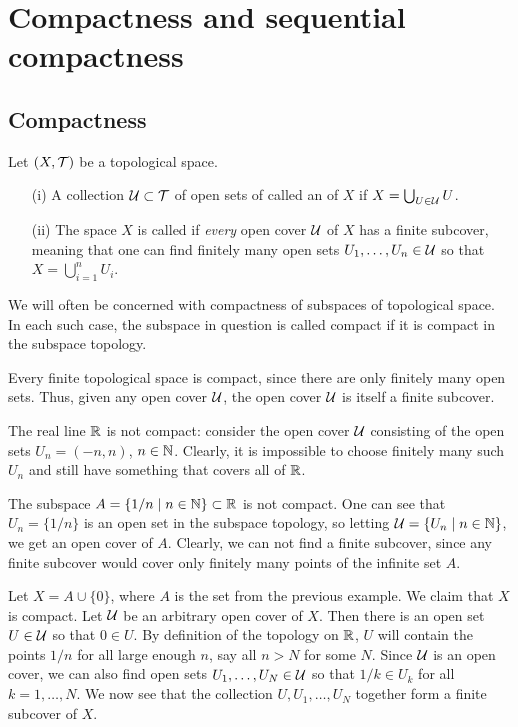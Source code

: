 \section{Compactness and sequential compactness}
\label{compactness}
\subsection{Compactness}
\begin{defn}
  Let $(X,\mathcal{T})$ be a topological space.
  \begin{enumerate}
    \item[(i)] A collection $\mathcal{U} \subset \mathcal{T}$ of open sets of called an  of $X$ if $X = \bigcup_{U \in \mathcal{U}} U$.
    \item[(ii)] The space $X$ is called  if \emph{every} open cover $\mathcal{U}$ of $X$ has a finite subcover, meaning that one can find finitely many open sets $U_1, \dots, U_n \in \mathcal{U}$ so that $X = \bigcup_{i=1}^n U_i$.
  \end{enumerate}
\end{defn}
We will often be concerned with compactness of subspaces of topological space. In each such case, the subspace in question is called compact if it is compact in the subspace topology.
\begin{example}
  Every finite topological space is compact, since there are only finitely many open sets. Thus, given any open cover $\mathcal{U}$, the open cover $\mathcal{U}$ is itself a finite subcover.
\end{example}
\begin{example}
  \label{reals-not-compact}
  The real line $\mathbb{R}$ is not compact: consider the open cover $\mathcal{U}$ consisting of the open sets $U_n = (-n,n)$, $n \in \mathbb{N}$. Clearly, it is impossible to choose finitely many such $U_n$ and still have something that covers all of $\mathbb{R}$.
\end{example}
\begin{example}
  The subspace $A = \{1/n \mid n \in \mathbb{N}\} \subset \mathbb{R}$ is not compact. One can see that $U_n = \{1/n\}$ is an open set in the subspace topology, so letting $\mathcal{U} = \{U_n \mid n \in \mathbb{N}\}$, we get an open cover of $A$. Clearly, we can not find a finite subcover, since any finite subcover would cover only finitely many points of the infinite set $A$.
\end{example}
\begin{example}
  Let $X = A \cup \{0\}$, where $A$ is the set from the previous example. We claim that $X$ is compact. Let $\mathcal{U}$ be an arbitrary open cover of $X$. Then there is an open set $U \in \mathcal{U}$ so that $0 \in U$. By definition of the topology on $\mathbb{R}$, $U$ will contain the points $1/n$ for all large enough $n$, say all $n > N$ for some $N$. Since $\mathcal{U}$ is an open cover, we can also find open sets $U_1, \dots, U_N \in \mathcal{U}$ so that $1/k \in U_k$ for all $k = 1, \dots, N$. We now see that the collection $U, U_1, \dots, U_N$ together form a finite subcover of $X$.
\end{example}
